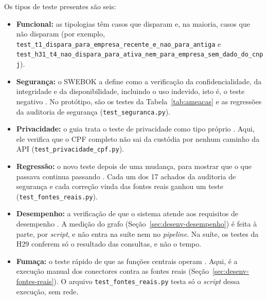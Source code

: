Os tipos de teste presentes são seis:
\begin{itemize}
	\item \textbf{Funcional:} as tipologias têm casos que disparam e, na
	maioria, casos que não disparam (por exemplo, \texttt{test\_\allowbreak{}t1\_\allowbreak{}dispara\_\allowbreak{}para\_\allowbreak{}empresa\_\allowbreak{}recente\_\allowbreak{}e\_\allowbreak{}nao\_\allowbreak{}para\_\allowbreak{}antiga}
	e \texttt{test\_\allowbreak{}h31\_\allowbreak{}t4\_\allowbreak{}nao\_\allowbreak{}dispara\_\allowbreak{}para\_\allowbreak{}ativa\_\allowbreak{}nem\_\allowbreak{}para\_\allowbreak{}empresa\_\allowbreak{}sem\_\allowbreak{}dado\_\allowbreak{}do\_\allowbreak{}cnpj}).
	\item \textbf{Segurança:} o SWEBOK a define como a verificação da
	confidencialidade, da integridade e da disponibilidade, incluindo o uso
	indevido, isto é, o teste negativo \cite[cap.~5, seç.~2.2.8]{swebok4}. No
	protótipo, são os testes da Tabela~\ref{tab:ameacas} e as regressões da
	auditoria de segurança (\texttt{test\_seguranca.py}).
	\item \textbf{Privacidade:} o guia trata o teste de privacidade como tipo
	próprio \cite[cap.~5, seç.~2.2.9]{swebok4}. Aqui, ele verifica que o CPF
	completo não sai da custódia por nenhum caminho da API
	(\texttt{test\_privacidade\_cpf.py}).
	\item \textbf{Regressão:} o novo teste depois de uma mudança, para mostrar
	que o que passava continua passando \cite[cap.~5, seç.~2.2.5]{swebok4}.
	Cada um dos 17 achados da auditoria de segurança e cada correção vinda das
	fontes reais ganhou um teste (\texttt{test\_fontes\_reais.py}).
	\item \textbf{Desempenho:} a verificação de que o sistema atende aos
	requisitos de desempenho \cite[cap.~5, seç.~2.2.7]{swebok4}. A medição do
	grafo (Seção~\ref{sec:desenv-desempenho}) é feita à parte, por
	\textit{script}, e não entra na suíte nem no \textit{pipeline}. Na suíte, os
	testes da H29 conferem só o resultado das consultas, e não o tempo.
	\item \textbf{Fumaça:} o teste rápido de que as funções centrais operam
	\cite[cap.~5, seç.~3.3.3]{swebok4}. Aqui, é a execução manual dos conectores
	contra as fontes reais (Seção~\ref{sec:desenv-fontes-reais}). O arquivo
	\texttt{test\_fontes\_reais.py} testa só o \textit{script} dessa execução,
	sem rede.
\end{itemize}

